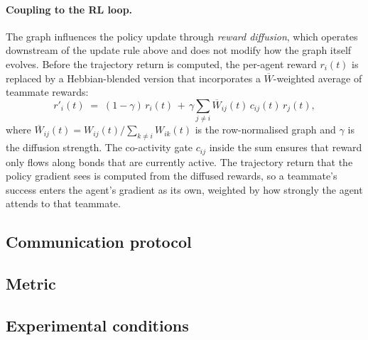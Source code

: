 \paragraph{Coupling to the RL loop.}
The graph influences the policy update through \emph{reward diffusion}, which operates downstream of the update rule above and does not modify how the graph itself evolves. Before the trajectory return is computed, the per-agent reward $r_i(t)$ is replaced by a Hebbian-blended version that incorporates a $\overline{W}$-weighted average of teammate rewards:
\[
r'_i(t) \;=\; (1 - \gamma) \, r_i(t) \,+\, \gamma \sum_{j \neq i} \overline{W}_{ij}(t) \, c_{ij}(t) \, r_j(t),
\]
where $\overline{W}_{ij}(t) = W_{ij}(t) / \sum_{k \neq i} W_{ik}(t)$ is the row-normalised graph and $\gamma$ is the diffusion strength. The co-activity gate $c_{ij}$ inside the sum ensures that reward only flows along bonds that are currently active. The trajectory return that the policy gradient sees is computed from the diffused rewards, so a teammate's success enters the agent's gradient as its own, weighted by how strongly the agent attends to that teammate.


\subsection*{Communication protocol}
\subsection*{Metric}

\subsection*{Experimental conditions}
